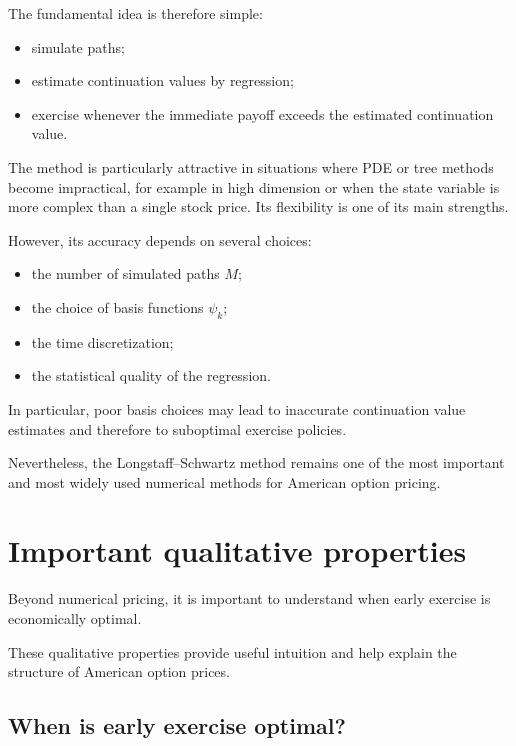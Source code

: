 \documentclass[11pt]{article}
\theoremstyle{definition}
\theoremstyle{plain}
\begin{document}
\medskip

The fundamental idea is therefore simple:
\begin{itemize}[leftmargin=1.4em]
\item simulate paths;
\item estimate continuation values by regression;
\item exercise whenever the immediate payoff exceeds the estimated
continuation value.
\end{itemize}

\medskip

The method is particularly attractive in situations where PDE or tree
methods become impractical, for example in high dimension or when the
state variable is more complex than a single stock price.
Its flexibility is one of its main strengths.

However, its accuracy depends on several choices:
\begin{itemize}[leftmargin=1.4em]
\item the number of simulated paths \(M\);
\item the choice of basis functions \(\psi_k\);
\item the time discretization;
\item the statistical quality of the regression.
\end{itemize}

In particular, poor basis choices may lead to inaccurate continuation
value estimates and therefore to suboptimal exercise policies.

\medskip

Nevertheless, the Longstaff--Schwartz method remains one of the most
important and most widely used numerical methods for American option
pricing.
\section{Important qualitative properties}

Beyond numerical pricing, it is important to understand when early
exercise is economically optimal.

These qualitative properties provide useful intuition and help explain
the structure of American option prices.

\subsection{When is early exercise optimal?}
\end{document}
